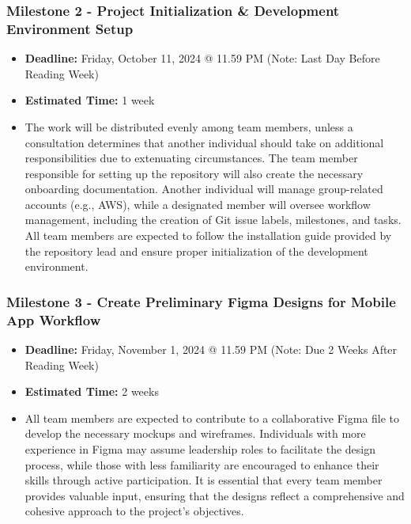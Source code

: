 \documentclass{article}
\begin{document}
\subsubsection*{Milestone 2 - Project Initialization \& Development Environment Setup}
\begin{itemize}
    \item \textbf{Deadline:} Friday, October 11, 2024 @ 11.59 PM (Note: Last Day
    Before Reading Week)
    \item \textbf{Estimated Time:} 1 week
    \item The work will be distributed evenly among team members, unless a
    consultation determines that another individual should take on additional
    responsibilities due to extenuating circumstances. The team member
    responsible for setting up the repository will also create the necessary
    onboarding documentation. Another individual will manage group-related
    accounts (e.g., AWS), while a designated member will oversee workflow
    management, including the creation of Git issue labels, milestones, and
    tasks. All team members are expected to follow the installation guide
    provided by the repository lead and ensure proper initialization of the
    development environment.
\end{itemize}

\subsubsection*{Milestone 3 - Create Preliminary Figma Designs for Mobile App Workflow}
\begin{itemize}
    \item \textbf{Deadline:} Friday, November 1, 2024 @ 11.59 PM (Note: Due 2
    Weeks After Reading Week)
    \item \textbf{Estimated Time:} 2 weeks
    \item All team members are expected to contribute to a collaborative Figma
    file to develop the necessary mockups and wireframes. Individuals with more
    experience in Figma may assume leadership roles to facilitate the design
    process, while those with less familiarity are encouraged to enhance their
    skills through active participation. It is essential that every team member
    provides valuable input, ensuring that the designs reflect a comprehensive
    and cohesive approach to the project's objectives.
\end{itemize}
\end{document}
